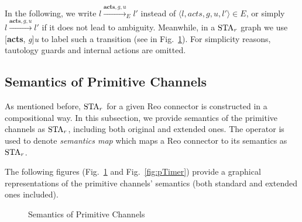 In the following, we write $l \xrightarrow{\textbf{acts}, g, u}_E l'$ instead of $\langle l, acts, g , u, l' \rangle \in E$, or simply $l \xrightarrow{\textbf{acts}, g, u} l'$ if it does not lead to ambiguity. Meanwhile, in a $\mbox{STA}_r$ graph we use [\textbf{acts}, \emph{g}]\emph{u} to label such a transition (see in Fig.~\ref{fig:basic}). For simplicity reasons, tautology guards and internal actions are omitted.

\subsection{Semantics of Primitive Channels}
As mentioned before,  $\mbox{STA}_r$ for a given Reo connector is constructed in a compositional way. In this subsection, we provide semantics of the primitive channels as $\mbox{STA}_r$, including both original and extended ones. The \sem{\cdot} operator is used to denote \emph{semantics map} which maps a Reo connector to its semantics as $\mbox{STA}_r$.

The following figures (Fig.~\ref{fig:basic} and Fig.~\ref{fig:pTimer}) provide a graphical representations of the primitive channels' semantics (both standard and extended ones included). 

\begin{figure}[H]
    \centering
    \resizebox{.9\textwidth}{!}{
        
    }
    \caption{Semantics of Primitive Channels}
    \label{fig:basic}
\end{figure}


